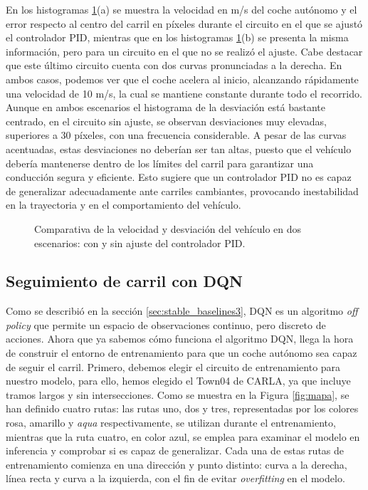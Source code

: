 En los histogramas \ref{fig:comparativa_pid}(a) se muestra la velocidad en m/s del coche autónomo y el error respecto al centro del carril en píxeles durante el circuito en el que se ajustó el controlador \ac{PID}, mientras que en los histogramas \ref{fig:comparativa_pid}(b) se presenta la misma información, pero para un circuito en el que no se realizó el ajuste. Cabe destacar que este último circuito cuenta con dos curvas pronunciadas a la derecha. En ambos casos, podemos ver que el coche acelera al inicio, alcanzando rápidamente una velocidad de 10 m/s, la cual se mantiene constante durante todo el recorrido. Aunque en ambos escenarios el histograma de la desviación está bastante centrado, en el circuito sin ajuste, se observan desviaciones muy elevadas, superiores a 30 píxeles, con una frecuencia considerable. A pesar de las curvas acentuadas, estas desviaciones no deberían ser tan altas, puesto que el vehículo debería mantenerse dentro de los límites del carril para garantizar una conducción segura y eficiente. Esto sugiere que un controlador \ac{PID} no es capaz de generalizar adecuadamente ante carriles cambiantes, provocando inestabilidad en la trayectoria y en el comportamiento del vehículo.

\begin{figure}[ht]
  \centering
  \hfill
  \caption{Comparativa de la velocidad y desviación del vehículo en dos escenarios: con y sin ajuste del controlador \ac{PID}.}
\label{fig:comparativa_pid}
\end{figure}

\subsection{Seguimiento de carril con \ac{DQN}}

Como se describió en la sección \ref{sec:stable_baselines3}, \ac{DQN} es un algoritmo \textit{off policy} que permite un espacio de observaciones continuo, pero discreto de acciones. Ahora que ya sabemos cómo funciona el algoritmo \ac{DQN}, llega la hora de construir el entorno de entrenamiento para que un coche autónomo sea capaz de seguir el carril. Primero, debemos elegir el circuito de entrenamiento para nuestro modelo, para ello, hemos elegido el Town04 de CARLA, ya que incluye tramos largos y sin intersecciones. Como se muestra en la Figura \ref{fig:mapa}, se han definido cuatro rutas: las rutas uno, dos y tres, representadas por los colores rosa, amarillo y \textit{aqua} respectivamente, se utilizan durante el entrenamiento, mientras que la ruta cuatro, en color azul, se emplea para examinar el modelo en inferencia y comprobar si es capaz de generalizar. Cada una de estas rutas de entrenamiento comienza en una dirección y punto distinto: curva a la derecha, línea recta y curva a la izquierda, con el fin de evitar \textit{overfitting} en el modelo.

